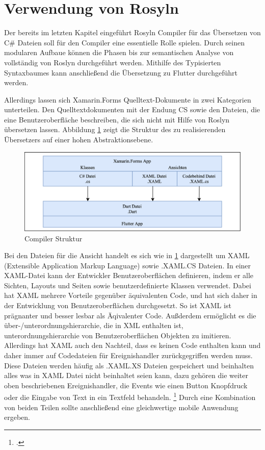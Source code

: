 \section{Verwendung von Rosyln}
Der bereits im letzten Kapitel eingeführt Rosyln Compiler für das Übersetzen von C\# Dateien soll für den Compiler eine essentielle Rolle spielen.  Durch seinen modularen Aufbaue können die Phasen bis zur semantischen Analyse von vollständig von Roslyn durchgeführt werden.  Mithilfe des Typisierten Syntaxbaumes kann anschließend die Übersetzung zu Flutter durchgeführt werden.  

Allerdings lassen sich Xamarin.Forms Quelltext-Dokumente in zwei Kategorien unterteilen.  Den Quelltextdokumenten mit der Endung CS sowie den Dateien,  die eine Benutzeroberfläche beschreiben,  die sich nicht mit Hilfe von Roslyn übersetzen lassen.  Abbildung \ref{fig:CompilerStruktur} zeigt die Struktur des zu realisierenden Übersetzers auf einer hohen Abstraktionsebene.
\begin{figure}[!ht]
 \includegraphics[width=14.5cm]{Images/Compiler/CompilerArchitecture.png}
 \caption{Compiler Struktur}
 \label{fig:CompilerStruktur}
\end{figure}




Bei den Dateien für die Ansicht handelt es sich wie in \ref{fig:CompilerStruktur} dargestellt um XAML (Extensible Application Markup Language) sowie .XAML.CS Dateien.  In einer XAML-Datei kann der Entwickler Benutzeroberflächen definieren, indem er alle Sichten, Layouts und Seiten sowie benutzerdefinierte Klassen verwendet.  Dabei hat XAML mehrere Vorteile gegenüber äquivalenten Code,  und hat sich daher in der Entwicklung von Benutzeroberflächen durchgesetzt.  So ist XAML ist prägnanter und besser lesbar als Äqivalenter Code.  Außderdem ermöglicht es die über-/unterordnungshierarchie, die in XML enthalten ist,  unterordnungshierarchie von Benutzeroberflächen Objekten zu imitieren.  Allerdings hat XAML auch den Nachteil, dass es keinen Code enthalten kann und daher immer auf Codedateien für Ereignishandler zurückgegriffen werden muss.  Diese Dateien werden häufig als .XAML.XS Dateien gespeichert und beinhalten alles was in XAML Datei nicht beinhaltet seien kann,  dazu gehören die weiter oben beschriebenen Ereignishandler,  die Events wie einen Button Knopfdruck oder die Eingabe von Text in ein Textfeld behandeln. \footcite[Vgl.][Abgerufen am \today]{MicrosoftXAML2017}
Durch eine Kombination von beiden Teilen sollte anschließend eine gleichwertige mobile Anwendung ergeben. 

